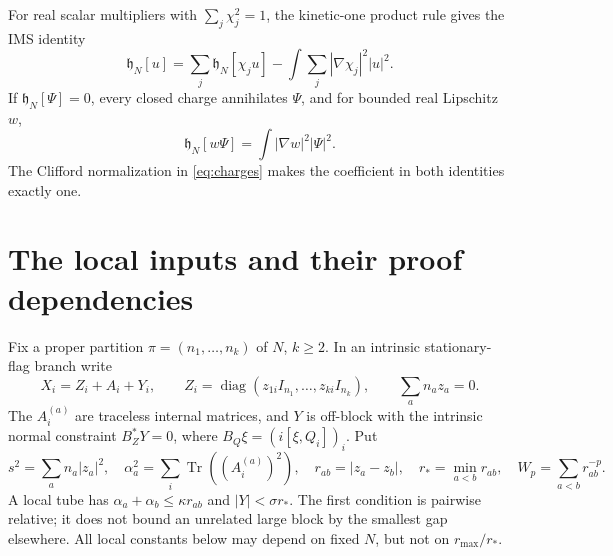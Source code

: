 \documentclass[11pt,letterpaper]{article}
\theoremstyle{definition}\newtheorem{hypothesis}[theorem]{Hypothesis}
\newcommand{\Tr}{\operatorname{Tr}}
\newcommand{\hh}{\mathfrak h}
\numberwithin{equation}{section}
\begin{document}
For real scalar multipliers with $\sum_j\chi_j^2=1$, the kinetic-one product rule gives the IMS identity
\begin{equation}
 \hh_N[u]=\sum_j\hh_N[\chi_ju]
                -\int\sum_j|\nabla\chi_j|^2|u|^2.\label{eq:ims}
\end{equation}
If $\hh_N[\Psi]=0$, every closed charge annihilates $\Psi$, and for bounded real Lipschitz $w$,
\begin{equation}
 \hh_N[w\Psi]=\int|\nabla w|^2|\Psi|^2.\label{eq:zeroidentity}
\end{equation}
The Clifford normalization in \eqref{eq:charges} makes the coefficient in both identities exactly one.

\section{The local inputs and their proof dependencies}\label{sec:inputs}
Fix a proper partition $\pi=(n_1,\ldots,n_k)$ of $N$, $k\ge2$. In an intrinsic stationary-flag branch write
\begin{equation}
 X_i=Z_i+A_i+Y_i,\qquad Z_i=\operatorname{diag}(z_{1i}I_{n_1},\ldots,z_{ki}I_{n_k}),
 \qquad\sum_an_az_a=0.
\end{equation}
The $A_i^{(a)}$ are traceless internal matrices, and $Y$ is off-block with the intrinsic normal constraint $B_Z^*Y=0$, where $B_Q\xi=(i[\xi,Q_i])_i$. Put
\begin{equation}
 s^2=\sum_an_a|z_a|^2,\quad
 \alpha_a^2=\sum_i\Tr((A_i^{(a)})^2),\quad
 r_{ab}=|z_a-z_b|,\quad r_* =\min_{a<b}r_{ab},\quad W_p=\sum_{a<b}r_{ab}^{-p}.
\end{equation}
A local tube has $\alpha_a+\alpha_b\le\kappa r_{ab}$ and $|Y|<\sigma r_*$. The first condition is pairwise relative; it does not bound an unrelated large block by the smallest gap elsewhere. All local constants below may depend on fixed $N$, but not on $r_{\max}/r_*$.
\end{document}
